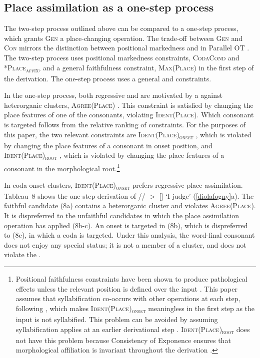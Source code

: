 \documentclass[output=paper]{LSP/langsci}
\begin{document}
\subsection{Place assimilation as a one-step process}

The two-step process outlined above can be compared to a one-step process, which grants \textsc{Gen} a place-changing operation. The trade-off between \textsc{Gen} and \textsc{Con} mirrors the distinction between positional markedness and  in Parallel OT \citep{zoll2004}. The two-step process uses positional markedness constraints, \textsc{CodaCond} and \textsc{*Place\textsubscript{affix}}, and a general faithfulness constraint, \textsc{Max(Place)} in the first step of the derivation. The one-step process uses a general  and  constraints.

In the one-step process, both regressive and  are motivated by a  against heterorganic clusters, \textsc{Agree(Place)} \citep{yip1991,lombardi1999,bakovic2000,bakovic2007}. This constraint is satisfied by changing the place features of one of the consonants, violating \textsc{Ident(Place)}. Which consonant is targeted follows from the relative ranking of  constraints. For the purposes of this paper, the two relevant constraints are \textsc{Ident(Place)\textsubscript{onset}} \citep{beckman1998}, which is violated by changing the place features of a consonant in onset position, and \textsc{Ident(Place)\textsubscript{root}} \citep{mccarthyprince1995}, which is violated by changing the place features of a consonant in the morphological root.\footnote{Positional faithfulness constraints have been shown to produce pathological effects unless the relevant position is defined over the input \citep{jesney2011}. This paper assumes that syllabification co-occurs with other operations at each step, following \citet{mccarthy2008}, which makes \textsc{Ident(Place)\textsubscript{onset}} meaningless in the first step as the input is not syllabified. This problem can be avoided by assuming syllabification applies at an earlier derivational step \citep{elfner2009}. \textsc{Ident(Place)\textsubscript{root}} does not have this problem because Consistency of Exponence ensures that morphological affiliation is invariant throughout the derivation \citep{mccarthyprince1993b}.}

In coda-onset clusters, \textsc{Ident(Place)\textsubscript{onset}} prefers regressive place assimilation. Tableau~8 shows the one-step derivation of // $>$ [] `I judge' (\ref{diolafogny}a). The faithful candidate (8a) contains a heterorganic cluster and violates \textsc{Agree(Place)}. It is dispreferred to the unfaithful candidates in which the place assimilation operation has applied (8b-c). An onset is targeted in (8b), which is dispreferred to (8c), in which a coda is targeted. Under this analysis, the word-final consonant does not enjoy any special status; it is not a member of a cluster, and does not violate the .
\end{document}
